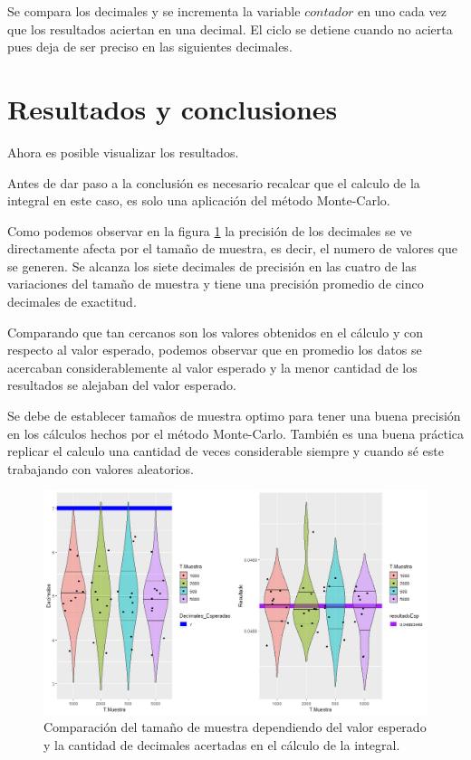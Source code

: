 \documentclass{article}
\begin{document}
Se compara los decimales y se incrementa la variable $contador$ en uno cada vez que los resultados aciertan en una decimal.
El ciclo se detiene cuando no acierta pues deja de ser preciso en las siguientes decimales.

\section{Resultados y conclusiones}
Ahora es posible visualizar los resultados.

Antes de dar paso a la conclusión es necesario recalcar que el calculo de la integral en este caso, es solo una aplicación del método Monte-Carlo.

Como podemos observar en la figura \ref{p5} la precisión de los decimales se ve directamente afecta por el tamaño de muestra, es decir, el numero de valores que se generen.
Se alcanza los siete decimales de precisión en las cuatro de las variaciones del tamaño de muestra y tiene una precisión promedio de cinco decimales de exactitud.

Comparando que tan cercanos son los valores obtenidos en el cálculo y con respecto al valor esperado, podemos observar que en promedio los datos se acercaban considerablemente al valor esperado y la menor cantidad de los resultados se alejaban del valor esperado.

Se debe de establecer tamaños de muestra optimo para tener una buena precisión en los cálculos hechos por el método Monte-Carlo.
También es una buena práctica replicar el calculo una cantidad de veces considerable siempre y cuando sé este trabajando con valores aleatorios.



\begin{figure}[H]
\centering
\includegraphics[width=180mm]{P5.png}
\caption{Comparación del tamaño de muestra dependiendo del valor esperado y la cantidad de decimales acertadas en el cálculo de la integral.}
\label{p5}
\end{figure}
\end{document}
